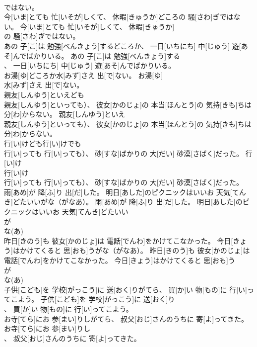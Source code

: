 \documentclass[8pt]{extreport}
\begin{document}
\begin{CJK}{UTF8}{min}
\\	ではない。	
\\	今[いま]とても 忙[いそが]しくて、 休暇[きゅうか]どころの 騒[さわ]ぎではない。	今[いま]とても 忙[いそが]しくて、 休暇[きゅうか]
\\	の 騒[さわ]ぎではない。	
\\	あの 子[こ]は 勉強[べんきょう]するどころか、 一日[いちにち] 中[じゅう] 遊[あそ]んでばかりいる。	あの 子[こ]は 勉強[べんきょう]する
\\	、 一日[いちにち] 中[じゅう] 遊[あそ]んでばかりいる。	
\\	お湯[ゆ]どころか水[みず]さえ 出[で]ない。	お湯[ゆ]
\\	水[みず]さえ 出[で]ない。	
\\	親友[しんゆう]といえども
\\	親友[しんゆう]といっても）、 彼女[かのじょ]の 本当[ほんとう]の 気持[きも]ちは 分[わ]からない。	親友[しんゆう]といえ
\\	親友[しんゆう]といっても）、 彼女[かのじょ]の 本当[ほんとう]の 気持[きも]ちは 分[わ]からない。	
\\	行[い]けども行[い]けでも
\\	行[い]っても 行[い]っても）、 砂[すな]ばかりの 大[だい] 砂漠[さばく]だった。	行[い]け
\\	行[い]け
\\	行[い]っても 行[い]っても）、 砂[すな]ばかりの 大[だい] 砂漠[さばく]だった。	
\\	雨[あめ]が 降[ふ]り 出[だ]した。 明日[あした]のピクニックはいいお 天気[てんき]どたいいがな（がなあ）。	雨[あめ]が 降[ふ]り 出[だ]した。 明日[あした]のピクニックはいいお 天気[てんき]どたいい
\\	が 
\\	な(あ)
\\	昨日[きのう]も 彼女[かのじょ]は 電話[でんわ]をかけてこなかった。 今日[きょう]はかけてくると 思[おも]うがな（がなあ）。	昨日[きのう]も 彼女[かのじょ]は 電話[でんわ]をかけてこなかった。 今日[きょう]はかけてくると 思[おも]う
\\	が 
\\	な(あ)
\\	子供[こども]を 学校[がっこう]に 送[おく]りがてら、 買[か]い 物[もの]に 行[い]ってこよう。	子供[こども]を 学校[がっこう]に 送[おく]り
\\	、 買[か]い 物[もの]に 行[い]ってこよう。	
\\	お寺[てら]にお 参[まい]りしがてら、 叔父[おじ]さんのうちに 寄[よ]ってきた。	お寺[てら]にお 参[まい]りし
\\	、 叔父[おじ]さんのうちに 寄[よ]ってきた。	

\end{CJK}
\end{document}
